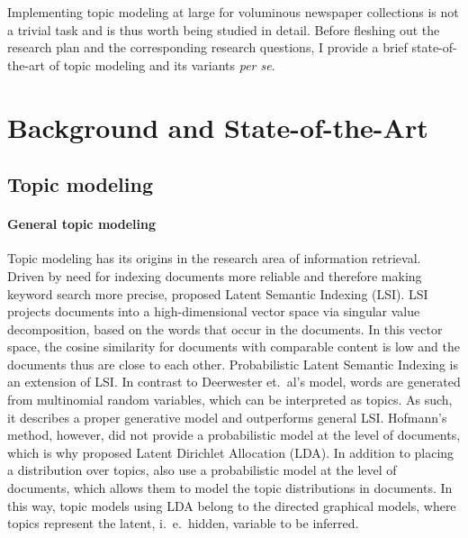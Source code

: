 Implementing topic modeling at large for voluminous newspaper collections is not a trivial task and is thus worth being studied in detail. Before fleshing out the research plan and the corresponding research questions, I provide a brief state-of-the-art of topic modeling and its variants \textit{per se}.

\section{Background and State-of-the-Art}

\subsection{Topic modeling}
\paragraph{General topic modeling}Topic modeling has its origins in the research area of information retrieval. Driven by need for indexing documents more reliable and therefore making keyword search more precise, \citet{deerwesterscottindexing1990} proposed Latent Semantic Indexing (LSI). LSI projects documents into a high-dimensional vector space via singular value decomposition, based on the words that occur in the documents. In this vector space, the cosine similarity for documents with comparable content is low and the documents thus are close to each other. Probabilistic Latent Semantic Indexing \citep{hofmannprobabilistic1999} is an extension of LSI. In contrast to Deerwester et.~al's model, words are generated from multinomial random variables, which can be interpreted as topics. As such, it describes a proper generative model and outperforms general LSI. Hofmann's method, however, did not provide a probabilistic model at the level of documents, which is why  \citet{bleilatent2003} proposed Latent Dirichlet Allocation (LDA). In addition to placing a distribution over topics, \citet{bleilatent2003} also use a probabilistic model at the level of documents, which allows them to model the topic distributions in documents. In this way, topic models using LDA belong to the directed graphical models, where topics represent the latent, i.~e.~hidden, variable to be inferred.

